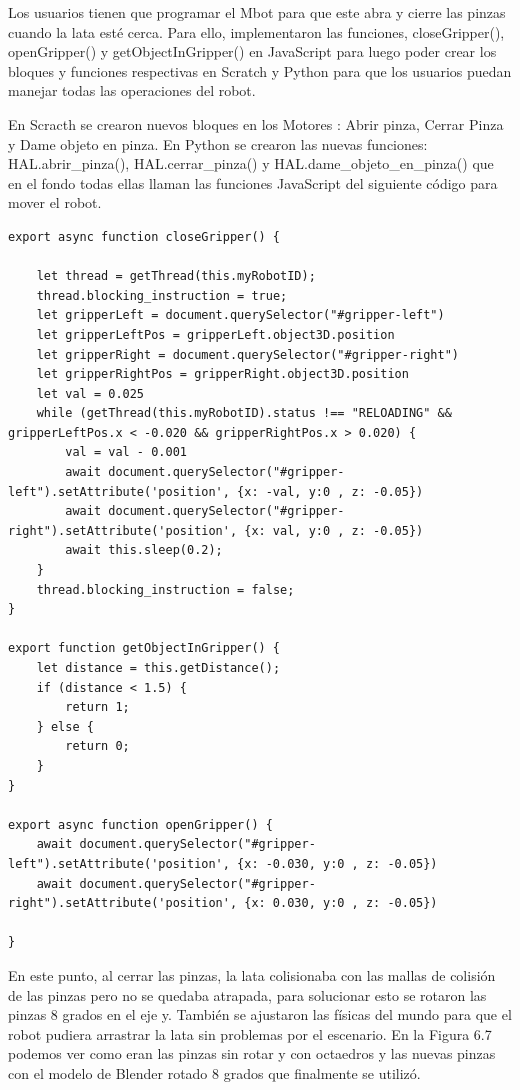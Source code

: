 Los usuarios tienen que programar el Mbot para que este abra y cierre las pinzas cuando la lata esté cerca. Para ello, implementaron las funciones, closeGripper(), openGripper() y getObjectInGripper() en JavaScript para luego poder crear los bloques y funciones respectivas en Scratch y Python para que los usuarios puedan manejar todas las operaciones del robot. 
 
 En Scracth se crearon nuevos bloques en los Motores : Abrir pinza, Cerrar Pinza y Dame objeto en pinza.
 En Python  se crearon las nuevas funciones: HAL.abrir\_pinza(), HAL.cerrar\_pinza() y  HAL.dame\_objeto\_en\_pinza() que en el fondo todas ellas llaman las funciones JavaScript  del siguiente código para mover el robot.
 
\begin{lstlisting}
export async function closeGripper() {

    let thread = getThread(this.myRobotID);
    thread.blocking_instruction = true;
    let gripperLeft = document.querySelector("#gripper-left")
    let gripperLeftPos = gripperLeft.object3D.position
    let gripperRight = document.querySelector("#gripper-right")
    let gripperRightPos = gripperRight.object3D.position
    let val = 0.025
    while (getThread(this.myRobotID).status !== "RELOADING" && gripperLeftPos.x < -0.020 && gripperRightPos.x > 0.020) {
        val = val - 0.001
        await document.querySelector("#gripper-left").setAttribute('position', {x: -val, y:0 , z: -0.05})
        await document.querySelector("#gripper-right").setAttribute('position', {x: val, y:0 , z: -0.05})
        await this.sleep(0.2);
    }
    thread.blocking_instruction = false;
}

export function getObjectInGripper() {
    let distance = this.getDistance();
    if (distance < 1.5) {
        return 1;
    } else {
        return 0;
    }
}

export async function openGripper() {
    await document.querySelector("#gripper-left").setAttribute('position', {x: -0.030, y:0 , z: -0.05})
    await document.querySelector("#gripper-right").setAttribute('position', {x: 0.030, y:0 , z: -0.05})

}
\end{lstlisting}

 
En este punto, al cerrar las pinzas,  la lata colisionaba con las mallas de colisión de las pinzas pero no se quedaba atrapada, para solucionar esto  se rotaron las pinzas 8  grados en el eje y. También se ajustaron las físicas del mundo para que el robot pudiera arrastrar la lata sin problemas por el escenario. En la Figura 6.7 podemos ver como eran las pinzas sin rotar y con octaedros y las nuevas pinzas con el modelo de Blender rotado 8 grados que finalmente se utilizó.


